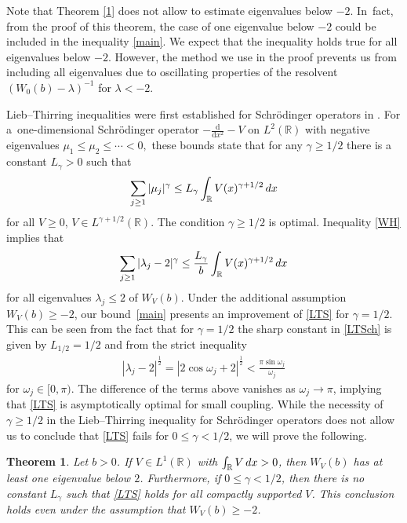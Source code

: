 \documentclass[11pt]{article}
\numberwithin{equation}{section}
\numberwithin{equation}{section}
\newtheorem{Theorem}{Theorem}[section]
\newcommand{\R}{\mathbb{R}}
\begin{document}
\begin{Remark}
Note that Theorem \ref{1} does not allow to estimate eigenvalues below $-2$. In~fact, from the proof of this theorem, the case of one eigenvalue below $-2$ could be included in the inequality \eqref{main}. We expect that the inequality holds true for all eigenvalues below $-2$. However, the method we use in the proof prevents us from including all eigenvalues due to oscillating properties of the resolvent $(W_0(b) - \lambda)^{-1}$ for $\lambda<-2$.
\end{Remark}

Lieb--Thirring inequalities were first established for Schr\"odinger operators in \cite{LT}. For a~one-dimensional Schr\"odinger operator ${-}\frac{\mathrm{d}}{\mathrm{d}x^2}-V$ on $L^2(\R)$ with negative eigenvalues \mbox{$\mu_1\le\mu_2\allowbreak\le\!\cdots\!<0,\!$} these bounds state that for any $\gamma\ge1/2$ there is a constant $L_\gamma>0$ such that
\begin{gather}
\sum_{j\ge 1}|\mu_j|^{\gamma}\le L_{\gamma}\int_{\R}V(x)^{\gamma+1/2}\, {\rm d} x
\label{LTSch}
\end{gather}
for all $V\ge0$, $V\in L^{\gamma+1/2}(\R)$. The condition $\gamma\ge1/2$ is optimal. Inequality \eqref{WH} implies that
\begin{gather}
\sum_{j\ge 1}|\lambda_j-2|^{\gamma}\le \frac{L_{\gamma}}{b}\int_{\R}V(x)^{\gamma+1/2}\, {\rm d} x
\label{LTS}
\end{gather}
for all eigenvalues $\lambda_j\le 2$ of $W_V(b)$. Under the additional assumption $W_V(b)\ge-2$, our bound~\eqref{main} presents an improvement of \eqref{LTS} for $\gamma=1/2$. This can be seen from the fact that for $\gamma=1/2$ the sharp constant in \eqref{LTSch} is given by $L_{1/2}=1/2$ \cite{HLT} and from the strict inequality
\begin{gather*}
|\lambda_j-2|^\frac12=|2\cos\omega_j+2|^\frac12<\frac{\pi\sin\omega_j}{\omega_j}
\end{gather*}
for $\omega_j\in[0,\pi)$.
The difference of the terms above vanishes as $\omega_j\to\pi$, implying that \eqref{LTS} is asymptotically optimal for small coupling. While the necessity of $\gamma\ge1/2$ in the Lieb--Thirring inequality for Schr\"odinger operators does not allow us to conclude that \eqref{LTS} fails for $0\le\gamma<1/2$, we will prove the following.

\begin{Theorem}\label{th:res}
Let $b>0$. If $V\in L^1(\R)$ with $\int_{\R}V\, {\rm d} x>0$, then $W_V(b)$ has at least one eigenvalue below $2$. Furthermore, if $0\le\gamma<1/2$, then there is no constant $L_\gamma$ such that \eqref{LTS} holds for all compactly supported $V$. This conclusion holds even under the assumption that $W_V(b)\ge-2$.
\end{Theorem}
\end{document}
